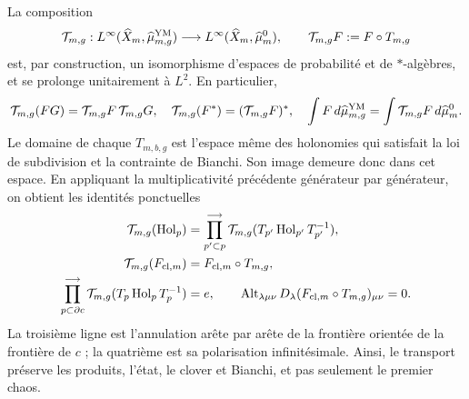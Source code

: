 La composition
\begin{equation}\label{eq:pdf2-ym-full-probability-isomorphism}
 \mathcal T_{m,g}:L^\infty(\widehat X_m,\widehat\mu_{m,g}^{\rm YM})
 \longrightarrow L^\infty(\widehat X_m,\widehat\mu_m^0),
 \qquad \mathcal T_{m,g}F:=F\circ T_{m,g}
\end{equation}
est, par construction, un isomorphisme d'espaces de probabilité et de $*$-algèbres, et se prolonge unitairement à $L^2$. En particulier,
\begin{equation}\label{eq:pdf2-ym-full-algebra-identities}
 \mathcal T_{m,g}(FG)=\mathcal T_{m,g}F\,\mathcal T_{m,g}G,
 \quad
 \mathcal T_{m,g}(F^*)=(\mathcal T_{m,g}F)^*,
 \quad
 \int F\,d\widehat\mu_{m,g}^{\rm YM}
 =\int\mathcal T_{m,g}F\,d\widehat\mu_m^0.
\end{equation}
Le domaine de chaque $T_{m,b,g}$ est l’espace même des holonomies qui satisfait
la loi de subdivision et la contrainte de Bianchi. Son image demeure donc
dans cet espace. En appliquant la multiplicativité précédente générateur par générateur, on
obtient les identités ponctuelles
\begin{equation}\label{eq:pdf2-ym-transport-surface-bianchi}
 \begin{aligned}
 \mathcal T_{m,g}(\operatorname{Hol}_p)
 &=\prod_{p'\subset p}^{\longrightarrow}
   \mathcal T_{m,g}(T_{p'}\operatorname{Hol}_{p'}T_{p'}^{-1}),\\
 \mathcal T_{m,g}(F_{{\rm cl},m})
 &=F_{{\rm cl},m}\circ T_{m,g},\\
 \prod_{p\subset\partial c}^{\longrightarrow}
 \mathcal T_{m,g}(T_p\operatorname{Hol}_pT_p^{-1})&=e,
 \qquad
 \operatorname{Alt}_{\lambda\mu\nu}
 D_\lambda(F_{{\rm cl},m}\circ T_{m,g})_{\mu\nu}=0.
 \end{aligned}
\end{equation}
La troisième ligne est l'annulation arête par arête de la frontière orientée de la frontière de $c$ ; la quatrième est sa polarisation infinitésimale. Ainsi, le transport préserve les produits, l'état, le clover et Bianchi, et pas seulement le premier chaos.

